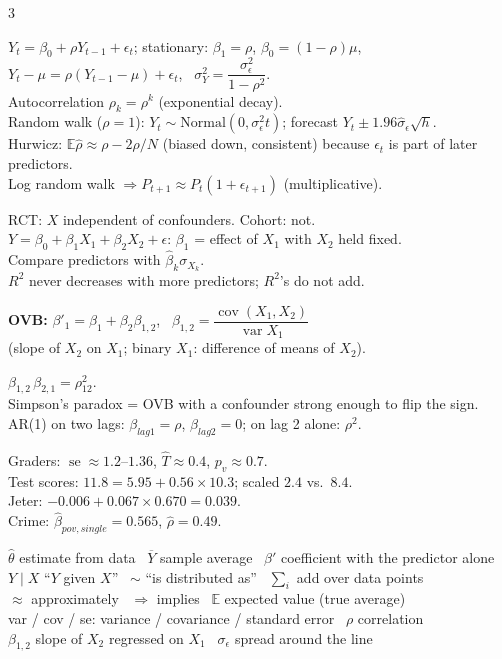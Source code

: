 \documentclass[11pt]{article}
\newcommand{\E}{\mathbb{E}}
\newcommand{\Var}{\operatorname{var}}
\newcommand{\Cov}{\operatorname{cov}}
\newcommand{\se}{\operatorname{se}}
\newcommand{\given}{\mid}
\newcommand{\Norm}{\text{Normal}}
\newcommand{\Ybar}{\overline{Y}}
\begin{document}
\begin{landscape}
\begin{multicols}{3}
\columnbreak

$Y_t=\beta_0+\rho Y_{t-1}+\epsilon_t$; stationary: $\beta_1=\rho$, $\beta_0=(1-\rho)\mu$,\\
$Y_t-\mu=\rho(Y_{t-1}-\mu)+\epsilon_t$, \ $\sigma_Y^2=\dfrac{\sigma_\epsilon^2}{1-\rho^2}$.\\
Autocorrelation $\rho_k=\rho^k$ (exponential decay).\\
Random walk ($\rho=1$): $Y_t\sim\Norm(0,\sigma_\epsilon^2t)$; forecast $Y_t\pm1.96\hat\sigma_\epsilon\sqrt h$.\\
Hurwicz: $\E\hat\rho\approx\rho-2\rho/N$ (biased down, consistent) because $\epsilon_t$ is part of later predictors.\\
Log random walk $\Rightarrow P_{t+1}\approx P_t(1+\epsilon_{t+1})$ (multiplicative).

RCT: $X$ independent of confounders. Cohort: not.\\
$Y=\beta_0+\beta_1X_1+\beta_2X_2+\epsilon$: $\beta_1$ = effect of $X_1$ with $X_2$ held fixed.\\
Compare predictors with $\hat\beta_k\sigma_{X_k}$.\\
$R^2$ never decreases with more predictors; $R^2$'s do not add.
\begin{cbox}
\textbf{OVB:} $\beta'_1=\beta_1+\beta_2\beta_{1,2}$, \ $\beta_{1,2}=\dfrac{\Cov(X_1,X_2)}{\Var X_1}$\\
(slope of $X_2$ on $X_1$; binary $X_1$: difference of means of $X_2$).
\end{cbox}
$\beta_{1,2}\,\beta_{2,1}=\rho_{12}^2$.\\
Simpson's paradox = OVB with a confounder strong enough to flip the sign.\\
AR(1) on two lags: $\beta_{lag1}=\rho$, $\beta_{lag2}=0$; on lag 2 alone: $\rho^2$.

Graders: $\se\approx1.2$--$1.36$, $\hat T\approx0.4$, $p_v\approx0.7$.\\
Test scores: $11.8=5.95+0.56\times10.3$; scaled $2.4$ vs.\ $8.4$.\\
Jeter: $-0.006+0.067\times0.670=0.039$.\\
Crime: $\hat\beta_{pov,single}=0.565$, $\hat\rho=0.49$.

$\hat\theta$ estimate from data \ $\Ybar$ sample average \ $\beta'$ coefficient with the predictor alone\\
$Y\given X$ ``$Y$ given $X$'' \ $\sim$ ``is distributed as'' \ $\sum_i$ add over data points\\
$\approx$ approximately \ $\Rightarrow$ implies \ $\E$ expected value (true average)\\
var / cov / se: variance / covariance / standard error \ $\rho$ correlation\\
$\beta_{1,2}$ slope of $X_2$ regressed on $X_1$ \ $\sigma_\epsilon$ spread around the line

\end{multicols}
\endgroup
\end{landscape}
\restoregeometry
\end{document}
